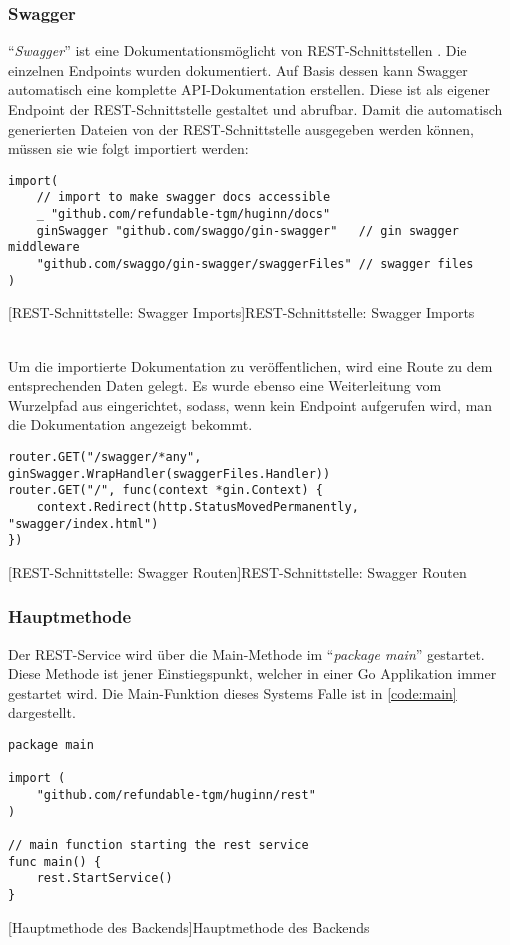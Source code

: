 \subsubsection{Swagger}

\enquote{\textit{Swagger}} ist eine Dokumentationsmöglicht von REST-Schnittstellen \cite{swaggo}. Die einzelnen Endpoints wurden dokumentiert. Auf Basis dessen kann Swagger automatisch eine  komplette API-Dokumentation erstellen. Diese ist als eigener Endpoint der REST-Schnittstelle gestaltet und abrufbar. Damit die automatisch generierten Dateien von der REST-Schnittstelle ausgegeben werden können, müssen sie wie folgt importiert werden:

\begin{verbatim}
import(
	// import to make swagger docs accessible
	_ "github.com/refundable-tgm/huginn/docs"
	ginSwagger "github.com/swaggo/gin-swagger"   // gin swagger middleware
	"github.com/swaggo/gin-swagger/swaggerFiles" // swagger files
)
\end{verbatim}
[REST-Schnittstelle: Swagger Imports]{REST-Schnittstelle: Swagger Imports \cite{swagtut}}

~\\ Um die importierte Dokumentation zu veröffentlichen, wird eine Route zu dem entsprechenden Daten gelegt. Es wurde ebenso eine Weiterleitung vom Wurzelpfad aus eingerichtet, sodass, wenn kein Endpoint aufgerufen wird, man die Dokumentation angezeigt bekommt.

\begin{verbatim}
router.GET("/swagger/*any", ginSwagger.WrapHandler(swaggerFiles.Handler))
router.GET("/", func(context *gin.Context) {
	context.Redirect(http.StatusMovedPermanently, "swagger/index.html")
})
\end{verbatim}
[REST-Schnittstelle: Swagger Routen]{REST-Schnittstelle: Swagger Routen}

\subsubsection{Hauptmethode}

Der REST-Service wird über die Main-Methode im \enquote{\textit{package main}} gestartet. Diese Methode ist jener Einstiegspunkt, welcher in einer Go Applikation immer gestartet wird. Die Main-Funktion dieses Systems Falle ist in \autoref{code:main} dargestellt.

\begin{verbatim}
package main

import (
	"github.com/refundable-tgm/huginn/rest"
)

// main function starting the rest service
func main() {
	rest.StartService()
}
\end{verbatim}
[Hauptmethode des Backends]{Hauptmethode des Backends}
\label{code:main}
